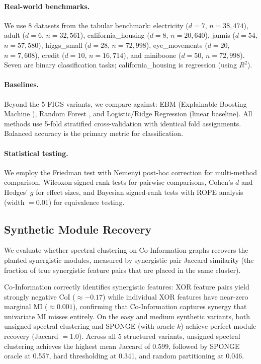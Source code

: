 \documentclass[11pt,letterpaper]{article}
\begin{document}
\paragraph{Real-world benchmarks.} We use 8 datasets from the \citet{Grinsztajn2022} tabular benchmark: electricity ($d{=}7$, $n{=}38{,}474$), adult ($d{=}6$, $n{=}32{,}561$), california\_housing ($d{=}8$, $n{=}20{,}640$), jannis ($d{=}54$, $n{=}57{,}580$), higgs\_small ($d{=}28$, $n{=}72{,}998$), eye\_movements ($d{=}20$, $n{=}7{,}608$), credit ($d{=}10$, $n{=}16{,}714$), and miniboone ($d{=}50$, $n{=}72{,}998$). Seven are binary classification tasks; california\_housing is regression (using $R^2$).

\paragraph{Baselines.} Beyond the 5 FIGS variants, we compare against: EBM (Explainable Boosting Machine \citep{Nori2019}), Random Forest \citep{Breiman2001}, and Logistic/Ridge Regression (linear baseline). All methods use 5-fold stratified cross-validation with identical fold assignments. Balanced accuracy is the primary metric for classification.

\paragraph{Statistical testing.} We employ the Friedman test with Nemenyi post-hoc correction for multi-method comparison, Wilcoxon signed-rank tests for pairwise comparisons, Cohen's $d$ and Hedges' $g$ for effect sizes, and Bayesian signed-rank tests with ROPE analysis (width $= 0.01$) for equivalence testing.

\subsection{Synthetic Module Recovery}
\label{sec:synthetic}

We evaluate whether spectral clustering on Co-Information graphs recovers the planted synergistic modules, measured by synergistic pair Jaccard similarity (the fraction of true synergistic feature pairs that are placed in the same cluster).

Co-Information correctly identifies synergistic features: XOR feature pairs yield strongly negative CoI ($\approx -0.17$) while individual XOR features have near-zero marginal MI ($\approx 0.001$), confirming that Co-Information captures synergy that univariate MI misses entirely. On the easy and medium synthetic variants, both unsigned spectral clustering and SPONGE (with oracle $k$) achieve perfect module recovery (Jaccard $= 1.0$). Across all 5 structured variants, unsigned spectral clustering achieves the highest mean Jaccard of 0.599, followed by SPONGE oracle at 0.557, hard thresholding at 0.341, and random partitioning at 0.046.
\end{document}
